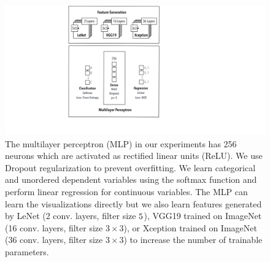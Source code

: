 \documentclass[journal]{vgtc}                %
\begin{document}
\begin{table}[t]
\centering
\caption{We use different feature generators as input to a multilayer perceptron which performs linear regression or the classification task. This yields different sets of trainable parameters. We also train the MLP directly on the visualizations without any additional feature generation.}
\label{tab:parameters}
\vspace{-4mm}
\end{table}



\begin{figure}[t]
	\centering
	  \includegraphics[width=.8\linewidth]{classifiers.pdf}
  \caption{The multilayer perceptron (MLP) in our experiments has 256 neurons which are activated as rectified linear units (ReLU). We use Dropout regularization to prevent overfitting. We learn categorical and unordered dependent variables using the softmax function and perform linear regression for continuous variables. The MLP can learn the visualizations directly but we also learn features generated by LeNet (2 conv. layers, filter size $5\time5$), VGG19 trained on ImageNet (16 conv. layers, filter size $3\times3$), or Xception trained on ImageNet (36 conv. layers, filter size $3\times3$) to increase the number of trainable parameters.}
	\label{fig:classifiers}
\end{figure}
\end{document}
